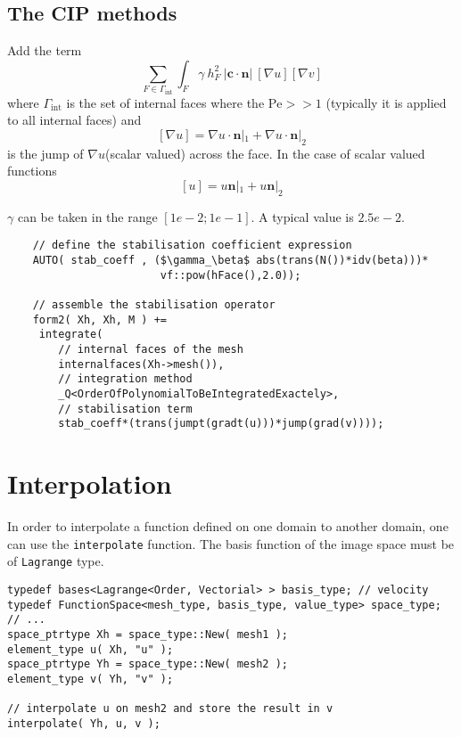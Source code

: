 \subsection{The CIP methods}
  Add the term
  \begin{equation}
    \label{notes:eq:47}
    \sum_{F \in \Gamma_\mathrm{int} } \int_{F} \gamma\ h_F^2\ |\mathbf{c} \cdot \mathbf{n}|\  [\nabla u]  [\nabla v]
  \end{equation}
  where $\Gamma_\mathrm{int}$ is the set of internal faces where the
  $\mathrm{Pe}>>1$ (typically it is applied to all internal faces) and
  \begin{equation}
    \label{notes:eq:50}
    [\nabla u] = \nabla u \cdot \mathbf{n}|_1 + \nabla u \cdot \mathbf{n}|_2
  \end{equation}
  is the jump of $\nabla u$(scalar valued) across the face.  In the
  case of scalar valued functions
  \begin{equation}
    \label{notes:eq:53}
    [u] = u \mathbf{n}|_1 + u \mathbf{n}|_2
  \end{equation}
  \begin{remark}
    $\gamma$ can be taken in the range $[1e-2;1e-1]$. A typical value is $2.5e-2$.
  \end{remark}


\begin{lstlisting}
    // define the stabilisation coefficient expression
    AUTO( stab_coeff , ($\gamma_\beta$ abs(trans(N())*idv(beta)))*
                        vf::pow(hFace(),2.0));

    // assemble the stabilisation operator
    form2( Xh, Xh, M ) +=
     integrate(
        // internal faces of the mesh
        internalfaces(Xh->mesh()),
        // integration method
        _Q<OrderOfPolynomialToBeIntegratedExactely>,
        // stabilisation term
        stab_coeff*(trans(jumpt(gradt(u)))*jump(grad(v))));
\end{lstlisting}

\section{Interpolation}

In order to interpolate a function defined on one domain to another domain, one
can use the \lstinline{interpolate} function. The basis function of the image
space must be of \lstinline{Lagrange} type.

\begin{lstlisting}
typedef bases<Lagrange<Order, Vectorial> > basis_type; // velocity
typedef FunctionSpace<mesh_type, basis_type, value_type> space_type;
// ...
space_ptrtype Xh = space_type::New( mesh1 );
element_type u( Xh, "u" );
space_ptrtype Yh = space_type::New( mesh2 );
element_type v( Yh, "v" );

// interpolate u on mesh2 and store the result in v
interpolate( Yh, u, v );
\end{lstlisting}


